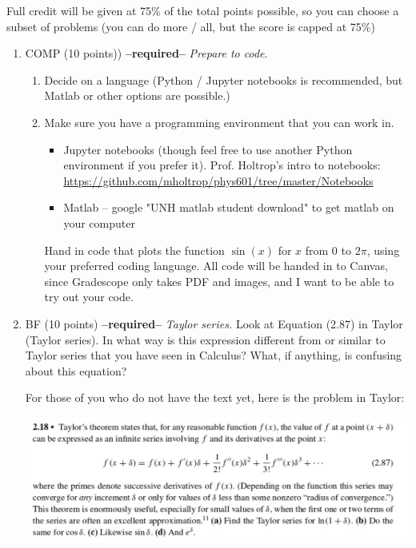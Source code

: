 \documentclass[12pt]{article}
\newcommand{\soln}[1] {\textit{Solution:} #1}
\renewcommand{\soln}[1] {}
\begin{document}
Full credit will be given at 75\% of the total points possible, so you can choose a subset of problems (you can do more / all, but the score is capped at 75\%)

\begin{enumerate}
  \item COMP (10 points)) \textbf{--required--} \textit{Prepare to code}.
  \begin{enumerate}
    \item Decide on a language (Python / Jupyter notebooks is recommended, but Matlab or other options are possible.)
    \item Make sure you have a programming environment that you can work in.
    \begin{itemize}
      \item Jupyter notebooks (though feel free to use another Python environment if you prefer it). Prof. Holtrop's intro to notebooks: \url{https://github.com/mholtrop/phys601/tree/master/Notebooks}
      \item Matlab -- google "UNH matlab student download" to get matlab on your computer
    \end{itemize}
    Hand in code that plots the function $\sin(x)$ for $x$ from $0$ to $2\pi$, using your preferred coding language. All code will be handed in to Canvas, since Gradescope only takes PDF and images, and I want to be able to try out your code.
  \end{enumerate}

\item BF (10 points) \textbf{--required--} \textit{Taylor series.} Look at Equation (2.87) in Taylor (Taylor series). In what way is this expression different from or similar to Taylor series that you have seen in Calculus? What, if anything, is confusing about this equation?

For those of you who do not have the text yet, here is the problem in Taylor:

\centerline{\includegraphics[width=.7\textwidth]{taylor.png}}

\soln{The Taylor series is often written with $f(x)$ on the l.h.s.\ (left hand side), rather than $f(x+\delta)$.

}
\end{enumerate}
\end{document}

